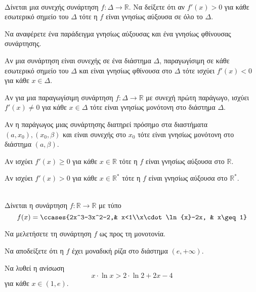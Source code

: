 \documentclass[twoside,nofonts,internet,math,spyros]{frontisthrio-diag}
\begin{document}
\begin{thema}
\item \mbox{}\\\vspace{-5mm}
\begin{erwthma}
\item Δίνεται μια συνεχής συνάρτηση $ f:\Delta\to\mathbb{R} $. Να δείξετε ότι αν $ f'(x)>0 $ για κάθε εσωτερικό σημείο του $ \Delta $ τότε η $ f $ είναι γνησίως αύξουσα σε όλο το $ \Delta $.
\item Να αναφέρετε ένα παράδειγμα γνησίως αύξουσας και ένα γνησίως φθίνουσας συνάρτησης.
\item \swstolathospan
\begin{alist}
\item Αν μια συνάρτηση είναι συνεχής σε ένα διάστημα $ \varDelta $, παραγωγίσιμη σε κάθε εσωτερικό σημείο του $ \varDelta $ και είναι γνησίως φθίνουσα στο $ \varDelta $ τότε ισχύει $ f'(x)<0 $ για κάθε $ x\in\varDelta $.
\item Αν για μια παραγωγίσιμη συνάρτηση $ f:\varDelta\to\mathbb{R} $ με συνεχή πρώτη παράγωγο, ισχύει $ f'(x)\neq 0 $ για κάθε $ x\in\varDelta $ τότε είναι γνησίως μονότονη στο διάστημα $ \varDelta $.
\item Αν η παράγωγος μιας συνάρτησης διατηρεί πρόσημο στα διαστήματα $ (a,x_0), (x_0,\beta) $ και είναι συνεχής στο $ x_0 $ τότε είναι γνησίως μονότονη στο διάστημα $ (a,\beta) $.
\item Αν ισχύει $ f'(x)\geq 0 $ για κάθε $ x\in\mathbb{R} $ τότε η $ f $ είναι γνησίως αύξουσα στο $ \mathbb{R} $.
\item Αν ισχύει $ f'(x)>0 $ για κάθε $ x\in\mathbb{R}^* $ τότε η $ f $ είναι γνησίως αύξουσα στο $ \mathbb{R}^* $.
\end{alist}
\end{erwthma}
\item\mbox{}\\
Δίνεται η συνάρτηση $ f:\mathbb{R}\to\mathbb{R} $ με τύπο
\[ f(x)=\ccases{2x^3-3x^2-2,& x<1\\x\cdot\ln{x}-2x, & x\geq 1} \]
\begin{erwthma}
\item Να μελετήσετε τη συνάρτηση $ f $ ως προς τη μονοτονία.
\item Να αποδείξετε ότι η $ f $ έχει μοναδική ρίζα στο διάστημα $ (e,+\infty) $.
\item Να λυθεί η ανίσωση \[ x\cdot\ln{x}>2\cdot\ln{2}+2x-4 \] για κάθε $ x\in(1,e) $.

\end{erwthma}
\end{thema}
\end{document}
